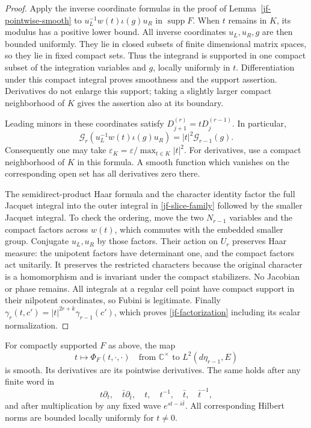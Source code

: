 \begin{proof}
Apply the inverse coordinate formulas in the proof of
Lemma~\ref{jf-pointwise-smooth} to
\(u_L^{-1}w(t)\iota(g)u_R\) in \(\operatorname{supp}F\).
When \(t\) remains in \(K\), its modulus has a positive
lower bound.  All inverse coordinates \(u_L,u_R,g\) are
then bounded uniformly.  They lie in closed subsets of
finite dimensional matrix spaces, so they lie in fixed
compact sets.  Thus the integrand is supported in one
compact subset of the integration variables and \(g\),
locally uniformly in \(t\).  Differentiation under this
compact integral proves smoothness and the support assertion.
Derivatives do not enlarge this support; taking a slightly
larger compact neighborhood of \(K\) gives the assertion
also at its boundary.

Leading minors in these coordinates satisfy
\(D_{j+1}^{(r)}=tD_j^{(r-1)}\).  In particular,
\[
 \mathcal G_r(u_L^{-1}w(t)\iota(g)u_R)
                                  =|t|^2\mathcal G_{r-1}(g).
\]
Consequently one may take
\(\varepsilon_K=\varepsilon/\max_{t\in K}|t|^2\).
For derivatives, use a compact neighborhood of \(K\) in
this formula.  A smooth function which vanishes on the
corresponding open set has all derivatives zero there.

The semidirect-product Haar formula and the character
identity factor the full Jacquet integral into the outer
integral in \eqref{jf-slice-family} followed by the smaller
Jacquet integral.  To check the ordering, move the two
\(N_{r-1}\) variables and the compact factors across
\(w(t)\), which commutes with the embedded smaller group.
Conjugate \(u_L,u_R\) by those factors.  Their action on
\(U_r\) preserves Haar measure: the unipotent factors
have determinant one, and the compact factors act unitarily.
It preserves the restricted characters because the original
character is a homomorphism and is invariant under the
compact stabilizers.  No Jacobian or phase remains.
All integrals at a regular cell point have compact support
in their nilpotent coordinates, so Fubini is legitimate.
Finally
\(\gamma_r(t,c')=|t|^{2r+k}\gamma_{r-1}(c')\),
which proves \eqref{jf-factorization} including its scalar
normalization.
\end{proof}

\begin{corollary}\label{jf-smooth-slices}
For compactly supported \(F\) as above, the map
\[
       t\longmapsto\Phi_F(t,\cdot,\cdot)
       \quad\text{from }\mathbb C^\times
                  \text{ to }L^2(d\eta_{r-1},E)
\]
is smooth.  Its derivatives are its pointwise derivatives.
The same holds after any finite word in
\[
       t\partial_t,\quad\bar t\partial_{\bar t},\quad
             t,\quad t^{-1},\quad\bar t,\quad\bar t^{-1},
\]
and after multiplication by any fixed wave
\(e^{st-\bar s\bar t}\).  All corresponding Hilbert norms
are bounded locally uniformly for \(t\ne0\).
\end{corollary}

